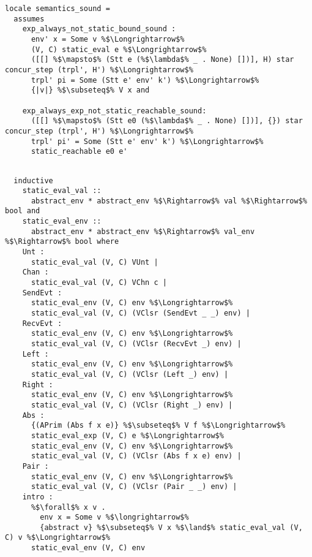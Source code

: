 \begin{lstlisting}[style=codestyle1, escapechar=\%]
locale semantics_sound =
  assumes
    exp_always_not_static_bound_sound :
      env' x = Some v %$\Longrightarrow$%
      (V, C) static_eval e %$\Longrightarrow$%
      ([[] %$\mapsto$% (Stt e (%$\lambda$% _ . None) [])], H) star concur_step (trpl', H') %$\Longrightarrow$%
      trpl' pi = Some (Stt e' env' k') %$\Longrightarrow$%
      {|v|} %$\subseteq$% V x and

    exp_always_exp_not_static_reachable_sound: 
      ([[] %$\mapsto$% (Stt e0 (%$\lambda$% _ . None) [])], {}) star concur_step (trpl', H') %$\Longrightarrow$%
      trpl' pi' = Some (Stt e' env' k') %$\Longrightarrow$%
      static_reachable e0 e'
  \end{lstlisting}


\begin{lstlisting}[style=codestyle1, escapechar=\%]

  inductive 
    static_eval_val ::
      abstract_env * abstract_env %$\Rightarrow$% val %$\Rightarrow$% bool and  
    static_eval_env ::
      abstract_env * abstract_env %$\Rightarrow$% val_env %$\Rightarrow$% bool where
    Unt :
      static_eval_val (V, C) VUnt |
    Chan :
      static_eval_val (V, C) VChn c |
    SendEvt :
      static_eval_env (V, C) env %$\Longrightarrow$%
      static_eval_val (V, C) (VClsr (SendEvt _ _) env) |
    RecvEvt :
      static_eval_env (V, C) env %$\Longrightarrow$%
      static_eval_val (V, C) (VClsr (RecvEvt _) env) |
    Left :
      static_eval_env (V, C) env %$\Longrightarrow$%
      static_eval_val (V, C) (VClsr (Left _) env) |
    Right :
      static_eval_env (V, C) env %$\Longrightarrow$%
      static_eval_val (V, C) (VClsr (Right _) env) |
    Abs :
      {(APrim (Abs f x e)} %$\subseteq$% V f %$\Longrightarrow$% 
      static_eval_exp (V, C) e %$\Longrightarrow$% 
      static_eval_env (V, C) env %$\Longrightarrow$%
      static_eval_val (V, C) (VClsr (Abs f x e) env) |
    Pair :
      static_eval_env (V, C) env %$\Longrightarrow$%
      static_eval_val (V, C) (VClsr (Pair _ _) env) |
    intro :  
      %$\forall$% x v .
        env x = Some v %$\longrightarrow$%
        {abstract v} %$\subseteq$% V x %$\land$% static_eval_val (V, C) v %$\Longrightarrow$%
      static_eval_env (V, C) env

  \end{lstlisting}
